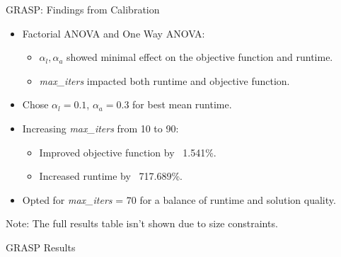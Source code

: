 \documentclass{beamer}
\begin{document}
\begin{frame}{GRASP: Findings from Calibration}
    \begin{itemize}
        \item Factorial ANOVA and One Way ANOVA:
            \begin{itemize}
                \item $\alpha_l, \alpha_a$ showed minimal effect on the objective function and runtime.
                \item \textit{max\_iters} impacted both runtime and objective function.
            \end{itemize}
        \item Chose $\alpha_l = 0.1$, $\alpha_a = 0.3$ for best mean runtime.
        \item Increasing \textit{max\_iters} from 10 to 90: 
            \begin{itemize}
                \item Improved objective function by ~1.541\%.
                \item Increased runtime by ~717.689\%.
            \end{itemize}
        \item Opted for \textit{max\_iters} = 70 for a balance of runtime and solution quality.
    \end{itemize}
    \small Note: The full results table isn't shown due to size constraints.
\end{frame}

\begin{frame}{GRASP Results}
    \begin{table}[h]
    \centering
    \caption{Comparison of Average values of Fine-tuned GRASP with 4 threads vs Gurobi}
    \label{tab:comparison}
\end{table}

\end{frame}
\end{document}
